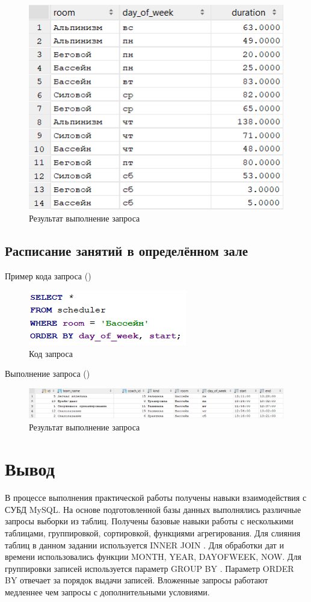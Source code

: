 \documentclass[a4paper,14pt]{article}
\begin{document}
	\begin{figure}[H]
		\centering		
		\includegraphics[width=0.5\linewidth]{image/selectLab_02_05_Res}
		\caption{Результат выполнение запроса}\label{img:selectLab_02_05_Res}
	\end{figure}

\subsection{Расписание занятий в определённом зале}

	Пример кода запроса ()
	
	\begin{figure}[H]
		\centering		
		\includegraphics[width=0.4\linewidth]{image/selectLab_02_06}
		\caption{Код запроса}\label{img:selectLab_02_06}
	\end{figure}
	
	Выполнение запроса ()
	
	\begin{figure}[H]
		\centering		
		\includegraphics[width=\linewidth]{image/selectLab_02_06_Res}
		\caption{Результат выполнение запроса}\label{img:selectLab_02_06_Res}
	\end{figure}

\section{Вывод}

В процессе выполнения практической работы получены навыки взаимодействия с СУБД MySQL. 
На основе подготовленной базы данных выполнялись различные запросы выборки из таблиц.
Получены базовые навыки работы с несколькими таблицами, группировкой, сортировкой, функциями агрегирования.
Для слияния таблиц в данном задании используется INNER JOIN \cite{sql1}.
Для обработки дат и времени использовались функции MONTH, YEAR, DAYOFWEEK, NOW.
Для группировки записей используется параметр GROUP BY \cite{sql2}.
Параметр ORDER BY отвечает за порядок выдачи записей.
Вложенные запросы работают медленнее чем запросы с дополнительными условиями.
\end{document}
